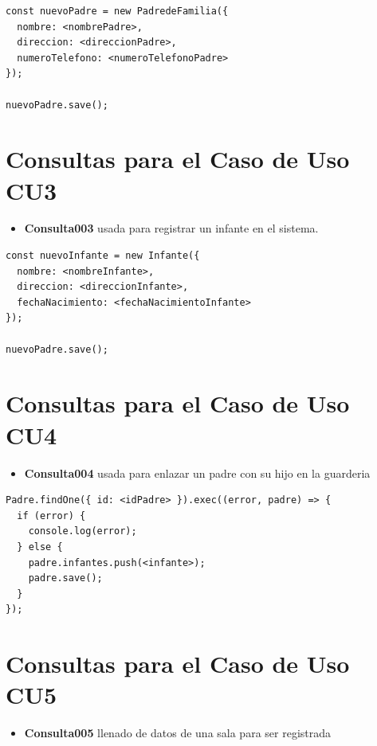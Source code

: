 \begin{verbatim}
const nuevoPadre = new PadredeFamilia({
  nombre: <nombrePadre>,
  direccion: <direccionPadre>,
  numeroTelefono: <numeroTelefonoPadre>
});
    
nuevoPadre.save();
\end{verbatim}


\section{Consultas para el Caso de Uso CU3}

\begin{itemize}
    \item \textbf{Consulta003} usada para registrar un infante en el sistema.
\end{itemize}

\begin{verbatim}
const nuevoInfante = new Infante({
  nombre: <nombreInfante>,
  direccion: <direccionInfante>,
  fechaNacimiento: <fechaNacimientoInfante>
});
    
nuevoPadre.save();
\end{verbatim}


\section{Consultas para el Caso de Uso CU4}

\begin{itemize}
    \item \textbf{Consulta004} usada para enlazar un padre con su hijo en la guarderia
\end{itemize}

\begin{verbatim}
Padre.findOne({ id: <idPadre> }).exec((error, padre) => {
  if (error) {
    console.log(error);
  } else {
    padre.infantes.push(<infante>);
    padre.save();
  }
});
\end{verbatim}


\section{Consultas para el Caso de Uso CU5}

\begin{itemize}
    \item \textbf{Consulta005} llenado de datos de una sala para ser registrada
\end{itemize}

